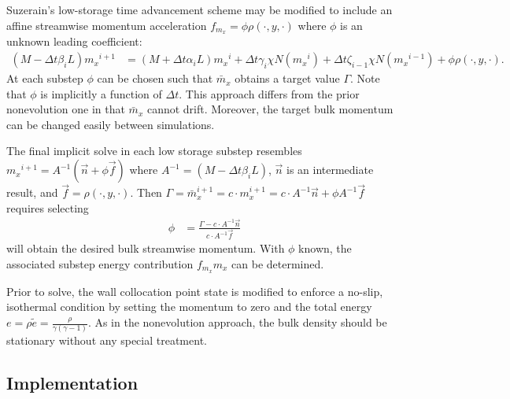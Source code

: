 \documentclass[letterpaper,11pt,nointlimits,reqno]{amsart}
\begin{document}
Suzerain's low-storage time advancement scheme may be modified to include an
affine streamwise momentum acceleration
$f_{m_x}=\phi\rho\!\left(\cdot,y,\cdot\right)$ where $\phi$ is an unknown leading
coefficient:
\begin{align}
  \left(M - \Delta{}t\beta_{i}L\right) {m_x}^{i+1}
  &=
  \left(M + \Delta{}t\alpha_{i}L\right) {m_x}^{i}
  + \Delta{}t\gamma_{i}\chi{}N\left({m_x}^{i}\right)
  + \Delta{}t\zeta_{i-1}\chi{}N\left({m_x}^{i-1}\right)
  + \phi{} \rho\!\left(\cdot,y,\cdot\right)
  .
\end{align}
At each substep $\phi$ can be chosen such that $\bar{m}_x$ obtains a target
value $\Gamma$.  Note that $\phi$ is implicitly a function of $\Delta{}t$.
This approach differs from the prior nonevolution one in that $\bar{m}_x$
cannot drift.  Moreover, the target bulk momentum can be changed easily between
simulations.

The final implicit solve in each low storage substep resembles ${m_x}^{i+1} =
A^{-1}\left(\vec{n} + \phi\vec{f}\right)$ where $A^{-1} = \left(M -
\Delta{}t\beta_{i}L\right)$, $\vec{n}$ is an intermediate result, and $\vec{f}
= \rho\!\left(\cdot,y,\cdot\right)$.  Then $\Gamma = \bar{m}_x^{i+1} = c \cdot
m_x^{i+1} = c \cdot{} A^{-1}\vec{n} + \phi{}A^{-1}\vec{f}$ requires selecting
\begin{align}
  \phi &= \frac{\Gamma - c \cdot{} A^{-1} \vec{n}}{c \cdot{} A^{-1} \vec{f}}
  \label{eq:phitarget}
\end{align}
will obtain the desired bulk streamwise momentum.  With $\phi$ known, the
associated substep energy contribution $f_{m_x} m_{x}$ can be determined.

Prior to solve, the wall collocation point state is modified to enforce a
no-slip, isothermal condition by setting the momentum to zero and the total
energy $e = \rho \tilde{e} = \frac{\rho}{\gamma\left(\gamma-1\right)}$.  As in
the nonevolution approach, the bulk density should be stationary without any
special treatment.

\subsection{Implementation}
\end{document}

